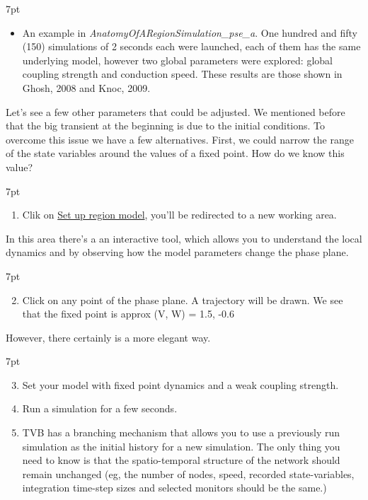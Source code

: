 \documentclass{tufte-handout}
\newenvironment{simulation}{%
  \def\FrameCommand{%
    \hspace{1pt}%
    {\color{ForestGreen}\vrule width 2pt}%
    {\color{simulationshade}\vrule width 4pt}%
    \colorbox{simulationshade}%
  }%
  \MakeFramed{\advance\hsize-\width\FrameRestore}%
  \noindent\hspace{-4.55pt}%
  \begin{adjustwidth}{}{7pt}%
  \vspace{2pt}\vspace{2pt}%
}
{%
  \vspace{2pt}\end{adjustwidth}\endMakeFramed%
}
\begin{document}
\begin{simulation}
\begin{itemize}
 \item An example in \textit{AnatomyOfARegionSimulation\_pse\_a}. One hundred and fifty (150) simulations of 2 seconds each were launched, each of them has the same underlying model, however two global parameters were explored: global coupling strength and conduction speed. These results are those shown in Ghosh, 2008 and Knoc, 2009. 
\end{itemize}
\end{simulation}


Let's see a few other parameters that could be adjusted. We mentioned before
that the big transient at the beginning is due to the initial conditions. To
overcome this issue we have a few alternatives. First, we could narrow the range of the state variables around the values of a fixed point. How do we know this value?

\begin{simulation}
\begin{enumerate}
\item  Clik on \underline{Set up region model}, you'll be redirected to a new working area.
\end{enumerate}
\end{simulation}


In this area there's a an interactive tool, which allows you to understand the
local dynamics and by observing how the model parameters change the phase
plane. 

\begin{simulation}
\begin{enumerate}[resume]
  \setcounter{enumi}{1}
\item  Click on any point of the phase plane. A trajectory will be drawn.
We see that the fixed point is approx (V, W) = 1.5, -0.6
\end{enumerate}
\end{simulation}


However, there certainly is a more elegant way. 

\begin{simulation}
\begin{enumerate}[resume]
  \setcounter{enumi}{2}
\item Set your model with fixed point dynamics and a weak coupling strength.
\item Run a simulation for a few seconds.
\item TVB has a branching mechanism that allows you to use a previously run
simulation as the initial history for a new simulation. The only thing you
need to know is that the spatio-temporal structure of the network should
remain unchanged (eg, the number of nodes, speed, recorded state-variables,
integration time-step sizes and selected monitors should be the same.)
\end{enumerate}
\end{simulation}
\end{document}
